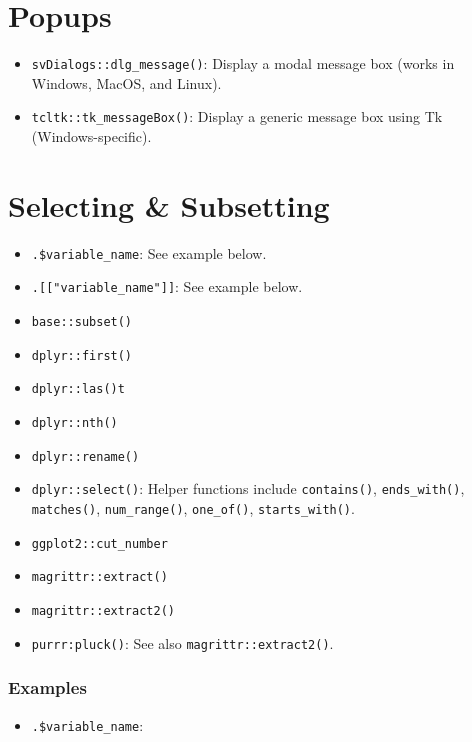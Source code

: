 \documentclass[
]{book}
\providecommand{\tightlist}{%
  \setlength{\itemsep}{0pt}\setlength{\parskip}{0pt}}
\begin{document}
\hypertarget{popups}{%
\section{Popups}\label{popups}}

\begin{itemize}
\tightlist
\item
  \texttt{svDialogs::dlg\_message()}: Display a modal message box (works in Windows, MacOS, and Linux).
\item
  \texttt{tcltk::tk\_messageBox()}: Display a generic message box using Tk (Windows-specific).
\end{itemize}

\hypertarget{selecting-subsetting}{%
\section{Selecting \& Subsetting}\label{selecting-subsetting}}

\begin{itemize}
\tightlist
\item
  \texttt{.\$variable\_name}: See example below.
\item
  \texttt{.{[}{[}"variable\_name"{]}{]}}: See example below.
\item
  \texttt{base::subset()}
\item
  \texttt{dplyr::first()}
\item
  \texttt{dplyr::las()t}
\item
  \texttt{dplyr::nth()}
\item
  \texttt{dplyr::rename()}
\item
  \texttt{dplyr::select()}: Helper functions include \texttt{contains()}, \texttt{ends\_with()}, \texttt{matches()}, \texttt{num\_range()}, \texttt{one\_of()}, \texttt{starts\_with()}.
\item
  \texttt{ggplot2::cut\_number}
\item
  \texttt{magrittr::extract()}
\item
  \texttt{magrittr::extract2()}
\item
  \texttt{purrr:pluck()}: See also \texttt{magrittr::extract2()}.
\end{itemize}

\hypertarget{examples-8}{%
\subsubsection{Examples}\label{examples-8}}

\begin{itemize}
\tightlist
\item
  \texttt{.\$variable\_name}:
\end{itemize}
\end{document}

